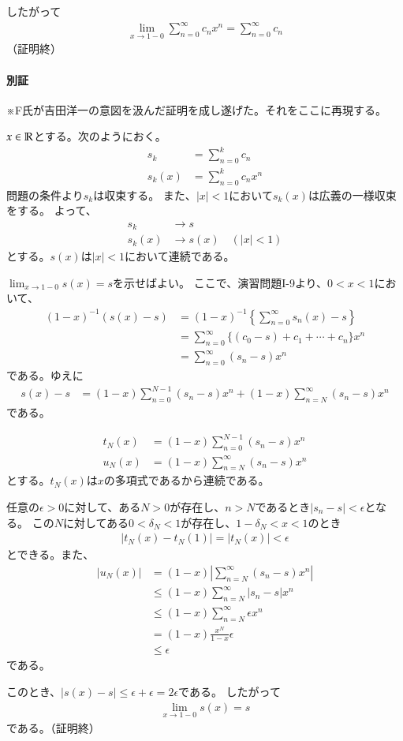 したがって
\begin{align*}
    \lim_{x\to 1-0}\sum_{n=0}^{\infty}c_nx^n=\sum_{n=0}^{\infty}c_n
\end{align*}
（証明終）

\paragraph{別証}
※F氏が吉田洋一の意図を汲んだ証明を成し遂げた。それをここに再現する。

$x\in\mathbb{R}$とする。次のようにおく。
\begin{align*}
    s_k&=\sum_{n=0}^{k}c_n\\
    s_k(x)&=\sum_{n=0}^{k}c_nx^n
\end{align*}
問題の条件より$s_k$は収束する。
また、$|x|<1$において$s_k(x)$は広義の一様収束をする。
よって、
\begin{align*}
    s_k&\longrightarrow s\\
    s_k(x)&\longrightarrow s(x)\quad(|x|<1)
\end{align*}
とする。$s(x)$は$|x|<1$において連続である。

$\lim_{x\to1-0}s(x)=s$を示せばよい。
ここで、演習問題I-9より、$0<x<1$において、
\begin{align*}
    (1-x)^{-1}(s(x)-s)
    &=(1-x)^{-1}\left\{\sum_{n=0}^{\infty}s_n(x)-s\right\}\\
    &=\sum_{n=0}^{\infty}\{(c_0-s)+c_1+\cdots+c_n\}x^n\\
    &=\sum_{n=0}^{\infty}(s_n-s)x^n
\end{align*}
である。ゆえに
\begin{align*}
    s(x)-s
    &=(1-x)\sum_{n=0}^{N-1}(s_n-s)x^n+(1-x)\sum_{n=N}^{\infty}(s_n-s)x^n
\end{align*}
である。

\begin{align*}
    t_N(x)&=(1-x)\sum_{n=0}^{N-1}(s_n-s)x^n\\
    u_N(x)&=(1-x)\sum_{n=N}^{\infty}(s_n-s)x^n
\end{align*}
とする。$t_N(x)$は$x$の多項式であるから連続である。

任意の$\epsilon>0$に対して、ある$N>0$が存在し、$n>N$であるとき$|s_n-s|<\epsilon$となる。
この$N$に対してある$0<\delta_N<1$が存在し、$1-\delta_N<x<1$のとき
\begin{align*}
    |t_N(x)-t_N(1)|=|t_N(x)|<\epsilon
\end{align*}
とできる。また、
\begin{align*}
    |u_N(x)|
    &=(1-x)\left|\sum_{n=N}^{\infty}(s_n-s)x^n\right|\\
    &\le(1-x)\sum_{n=N}^{\infty}|s_n-s|x^n\\
    &\le(1-x)\sum_{n=N}^{\infty}\epsilon x^n\\
    &=(1-x)\frac{x^N}{1-x}\epsilon\\
    &\le\epsilon
\end{align*}
である。

このとき、$|s(x)-s|\le \epsilon+\epsilon=2\epsilon$である。
したがって
\begin{align*}
    \lim_{x\to1-0}s(x)=s
\end{align*}
である。（証明終）

